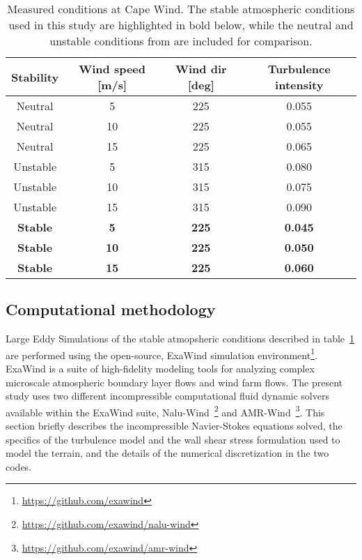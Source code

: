\begin{table}
\caption{\label{tab:CapeWindMeasurements} Measured conditions at Cape
  Wind.  The stable atmospheric conditions used in this study are
  highlighted in bold below, while the neutral and unstable conditions
  from \cite{cheung2020large} are included for comparison.} \centering
\begin{tabular}{cccc}
  \hline
  Stability    & Wind speed [m/s] & Wind dir [deg] & Turbulence intensity \\
  \hline
  Neutral      & 5                & 225            & 0.055           \\
  Neutral      & 10               & 225            & 0.055           \\
  Neutral      & 15               & 225            & 0.065           \\
  Unstable     & 5                & 315            & 0.080           \\
  Unstable     & 10               & 315            & 0.075           \\
  Unstable     & 15               & 315            & 0.090           \\
  \bf{Stable}  & \bf{5}           & \bf{225}       & \bf{0.045}      \\
  \bf{Stable}  & \bf{10}          & \bf{225}       & \bf{0.050}      \\
  \bf{Stable}  & \bf{15}          & \bf{225}       & \bf{0.060}      \\
\hline
\end{tabular}
\end{table}


\subsection{Computational methodology}

Large Eddy Simulations of the stable atmopsheric conditions described in
table~\ref{tab:CapeWindMeasurements} are performed using the open-source,
ExaWind simulation environment\footnote{\url{https://github.com/exawind}}.
ExaWind is a suite of high-fidelity modeling tools for analyzing complex
microscale atmospheric boundary layer flows and wind farm flows. The present
study uses two different incompressible computational fluid dynamic solvers
available within the ExaWind suite,
Nalu-Wind~\footnote{\url{https://github.com/exawind/nalu-wind}} and
AMR-Wind~\footnote{\url{https://github.com/exawind/amr-wind}}. This section
briefly describes the incompressible Navier-Stokes equations solved,
the specifics of the turbulence model and the wall shear stress
formulation used to model the terrain, and the details of the numerical
discretization in the two codes.

